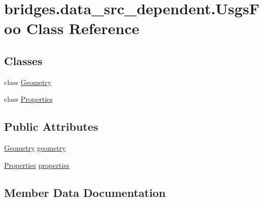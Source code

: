 \hypertarget{classbridges_1_1data__src__dependent_1_1_usgs_foo}{}\section{bridges.\+data\+\_\+src\+\_\+dependent.\+Usgs\+Foo Class Reference}
\label{classbridges_1_1data__src__dependent_1_1_usgs_foo}
\subsection*{Classes}
\begin{DoxyCompactItemize}
\item 
class \mbox{\hyperlink{classbridges_1_1data__src__dependent_1_1_usgs_foo_1_1_geometry}{Geometry}}
\item 
class \mbox{\hyperlink{classbridges_1_1data__src__dependent_1_1_usgs_foo_1_1_properties}{Properties}}
\end{DoxyCompactItemize}
\subsection*{Public Attributes}
\begin{DoxyCompactItemize}
\item 
\mbox{\hyperlink{classbridges_1_1data__src__dependent_1_1_usgs_foo_1_1_geometry}{Geometry}} \mbox{\hyperlink{classbridges_1_1data__src__dependent_1_1_usgs_foo_af660c68abc5a7feac8c76f025ff9847e}{geometry}}
\item 
\mbox{\hyperlink{classbridges_1_1data__src__dependent_1_1_usgs_foo_1_1_properties}{Properties}} \mbox{\hyperlink{classbridges_1_1data__src__dependent_1_1_usgs_foo_a030d83e136f146824b5bda34a4c6fd1c}{properties}}
\end{DoxyCompactItemize}


\subsection{Member Data Documentation}
\mbox{\label{classbridges_1_1data__src__dependent_1_1_usgs_foo_af660c68abc5a7feac8c76f025ff9847e}} 
